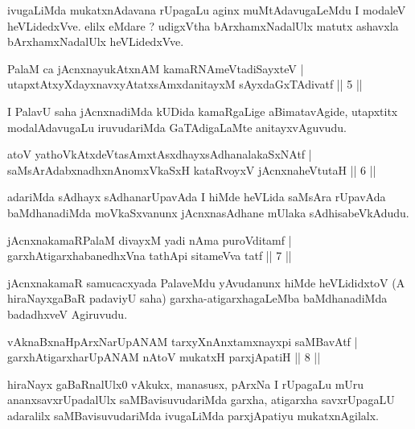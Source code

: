 \begin{artha}
ivugaLiMda mukatxnAdavana rUpagaLu aginx muMtAdavugaLeMdu I modaleV heVLidedxVve. elilx eMdare ? udigxVtha bArxhamxNadalUlx matutx ashavxla bArxhamxNadalUlx heVLidedxVve.
\end{artha}


\begin{shl}
PalaM ca jAcnxnayukAtxnAM kamaRNAmeVtadiSayxteV |\\
utapxtAtxyXdayxnavxyAtatxsAmxdanitayxM sAyxdaGxTAdivatf \hfill || 5 ||
\end{shl}

\begin{artha}
I PalavU saha jAcnxnadiMda kUDida kamaRgaLige aBimatavAgide, utapxtitx modalAdavugaLu iruvudariMda GaTAdigaLaMte anitayxvAguvudu.
\end{artha}

\begin{shl}
atoV yathoVkAtxdeVtasAmxtAsxdhayxsAdhanalakaSxNAtf |\\
saMsArAdabxnadhxnAnomxVkaSxH kataRvoyxV jAcnxnaheVtutaH \hfill || 6 ||
\end{shl}

\begin{artha}
adariMda sAdhayx sAdhanarUpavAda I hiMde heVLida saMsAra rUpavAda baMdhanadiMda moVkaSxvanunx jAcnxnasAdhane mUlaka sAdhisabeVkAdudu.
\end{artha}


\begin{shl}
jAcnxnakamaRPalaM divayxM yadi nAma puroVditamf |\\
garxhAtigarxhabanedhxVna tathA\s pi sitameVva tatf \hfill || 7 || 
\end{shl}

\begin{artha}
jAcnxnakamaR samucacxyada PalaveMdu yAvudanunx hiMde heVLididxtoV (A hiraNayxgaBaR padaviyU saha) garxha-atigarxhagaLeMba baMdhanadiMda badadhxveV Agiruvudu.
\end{artha}

\begin{shl}
vAknaBxnaHpArxNarUpANAM tarxyXnAnxtamxnayxpi saMBavAtf |\\
garxhAtigarxharUpANAM nAtoV mukatxH parxjApatiH \hfill || 8 ||
\end{shl}

\begin{artha}
hiraNayx gaBaRnalUlx0 vAkukx, manasusx, pArxNa I rUpagaLu mUru ananxsavxrUpadalUlx saMBavisuvudariMda garxha, atigarxha savxrUpagaLU adaralilx saMBavisuvudariMda ivugaLiMda parxjApatiyu mukatxnAgilalx.
\end{artha}

